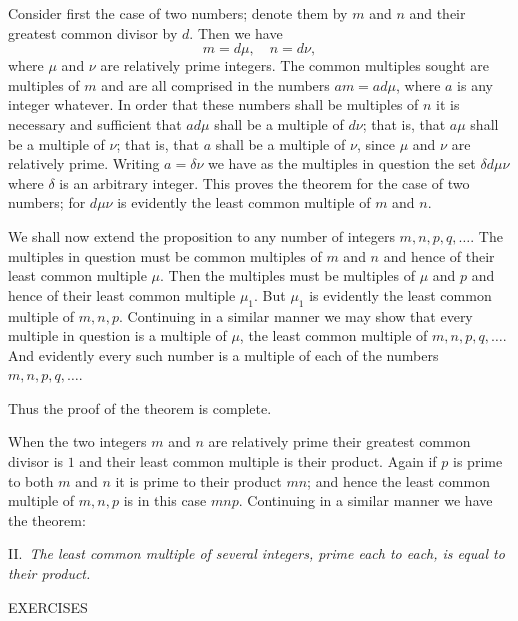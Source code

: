 \documentclass[oneside]{book}
\begin{document}
Consider first the case of two numbers; denote them by $m$ and $n$
and their greatest common divisor by $d$. Then we have
\begin{equation*}
m = d\mu, \quad n = d\nu,
\end{equation*}
where $\mu$ and $\nu$ are relatively prime
integers. The
common multiples sought are multiples of $m$ and are all comprised
in the numbers $am=ad\mu$, where $a$ is any integer whatever. In
order that these numbers shall be multiples of $n$ it is necessary
and sufficient that $ad\mu$ shall be a multiple of $d\nu$; that is,
that $a\mu$ shall be a multiple of $\nu$; that is, that $a$ shall be
a multiple of $\nu$, since $\mu$ and $\nu$ are relatively prime.
Writing $a = \delta\nu$ we have as the multiples in question the set
$\delta d\mu\nu$ where $\delta$ is an arbitrary integer. This proves
the theorem for the case of two numbers; for $d\mu\nu$ is evidently
the least common multiple of $m$ and $n$.

We shall now extend the proposition to any number of integers $m, n,
p, q,\ldots$. The multiples in question must be common multiples of
$m$ and $n$ and hence of their least common multiple $\mu$. Then the
multiples must be multiples of $\mu$ and $p$ and hence of their
least common multiple $\mu_1$. But $\mu_1$ is evidently the least
common multiple of $m, n, p$. Continuing in a similar manner we may
show that every multiple in question is a multiple of $\mu$, the
least common multiple of $m, n, p, q, \ldots$. And evidently every
such number is a multiple of each of the numbers $m, n, p, q,
\ldots$.

Thus the proof of the theorem is complete.

When the two integers $m$ and $n$ are relatively prime their
greatest common divisor is $1$ and their least common multiple is
their product. Again if $p$ is prime to both $m$ and $n$ it is prime
to their product $mn$; and hence the least common multiple of $m, n,
p$ is in this case $mnp$. Continuing in a similar manner we have the
theorem:

\smallskip II.~\emph{The least common multiple of several integers,
prime each to each, is equal to their product.}

\newpage
\begin{center}
EXERCISES
\end{center}
\end{document}
